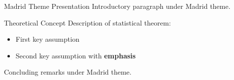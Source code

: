 \documentclass[14pt,t]{beamer}
\begin{document}
\begin{frame}{Madrid Theme Presentation}
Introductory paragraph under Madrid theme.

\begin{block}{Theoretical Concept}
Description of statistical theorem:
\begin{itemize}
\item First key assumption
\item Second key assumption with \textbf{emphasis}
\end{itemize}
\end{block}

Concluding remarks under Madrid theme.
\end{frame}
\end{document}
